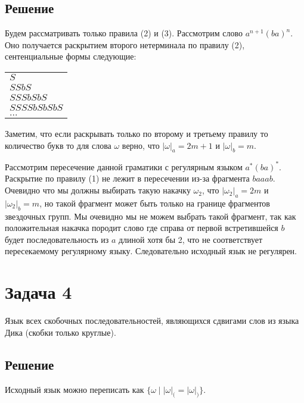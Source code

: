 \documentclass[a4paper, 14pt]{extarticle}
\begin{document}
\subsection{Решение}

Будем рассматривать только правила (2) и (3). Рассмотрим слово $a^{n + 1}(ba)^n$. Оно
получается раскрытием второго нетерминала по правилу (2), сентенциальные формы следующие:

\begin{center}
  \begin{tabular}{l}
    $S$ \\
    $SSbS$ \\
    $SSSbSbS$ \\
    $SSSSbSbSbS$ \\
    $...$
  \end{tabular}
\end{center}

Заметим, что если раскрывать только по второму и третьему правилу то количество букв то для
слова $\omega$ верно, что $|\omega|_a = 2m + 1$ и $|\omega|_b = m$.

Рассмотрим пересечение данной граматики с регулярным языком $a^*(ba)^*$. Раскрытие по правилу (1)
не лежит в пересечении из-за фрагмента $baaab$. Очевидно что мы должны выбирать такую накачку
$\omega_2$, что $|\omega_2|_a = 2m$ и $|\omega_2|_b = m$, но такой фрагмент может быть только
на границе фрагментов звездочных групп. Мы очевидно мы не можем выбрать такой фрагмент, так
как положительная накачка породит слово где справа от первой встретившейся $b$ будет
последовательность из $a$ длиной хотя бы 2, что не соответствует пересекаемому регулярному языку. 
Следовательно исходный язык не регулярен.

\newpage
\section{Задача 4}

Язык всех скобочных последовательностей, являющихся сдвигами слов из языка Дика
(скобки только круглые).

\subsection{Решение}

Исходный язык можно переписать как $\{ \omega \mid |\omega|_( = |\omega|_)\}$. 
\end{document}
